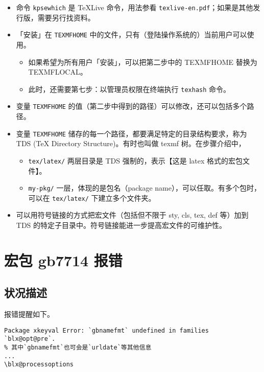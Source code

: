 \documentclass[../Main/thesis.tex]{subfiles}
\begin{document}
\begin{itemize}
\item
  命令 \texttt{kpsewhich} 是 \TeX Live 命令，用法参看
  \texttt{texlive-en.pdf}；如果是其他发行版，需要另行找资料。
\item
  「安装」在 \texttt{TEXMFHOME}
  中的文件，只有（登陆操作系统的）当前用户可以使用。

  \begin{itemize}
  \item
    如果希望为所有用户「安装」，可以把第二步中的 TEXMFHOME 替换为
    TEXMFLOCAL。
  \item
    此时，还需要第七步：以管理员权限在终端执行 \texttt{texhash} 命令。
  \end{itemize}
\item
  变量 \texttt{TEXMFHOME}
  的值（第二步中得到的路径）可以修改，还可以包括多个路径。
\item
  变量 \texttt{TEXMFHOME}
  储存的每一个路径，都要满足特定的目录结构要求，称为 TDS (TeX Directory
  Structure)。有时也叫做 texmf 树。在步骤介绍中，

  \begin{itemize}
  \item
    \texttt{tex/latex/} 两层目录是 TDS 强制的，表示【这是 latex
    格式的宏包文件】。
  \item
    \texttt{my-pkg/} 一层，体现的是包名（package
    name），可以任取。有多个包时，可以在 \texttt{tex/latex/}
    下建立多个文件夹。
  \end{itemize}
\item
  可以用符号链接的方式把宏文件（包括但不限于 sty, cls, tex, def 等）加到
  TDS 的特定子目录中。符号链接能进一步提高宏文件的可维护性。
\end{itemize}

\section{宏包 gb7714 报错}

\subsection{状况描述}

报错提醒如下。

\begin{verbatim}
Package xkeyval Error: `gbnamefmt` undefined in families `blx@opt@pre`.
% 其中`gbnamefmt`也可会是`urldate`等其他信息
...
\blx@processoptions
\end{verbatim}
\end{document}
